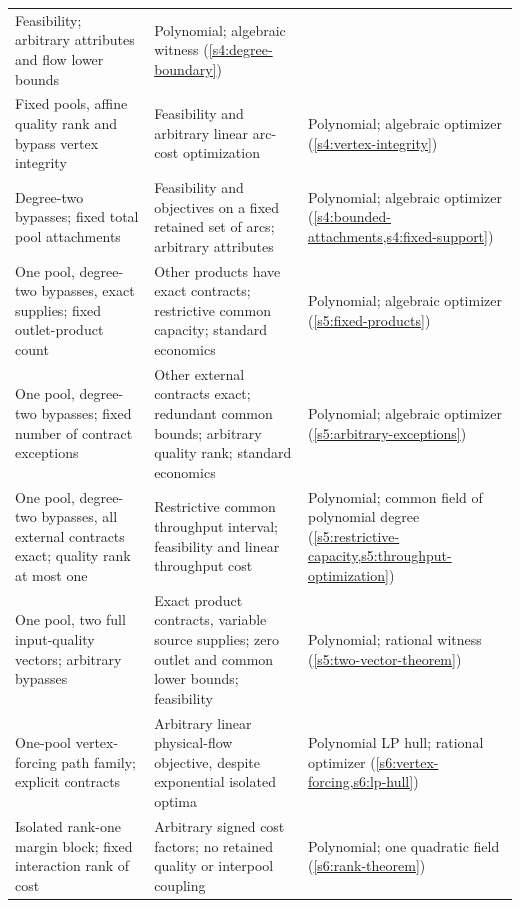 {\begin{longtable}{@{}>{\raggedright\arraybackslash}p{}>{\raggedright\arraybackslash}p{}>{\raggedright\arraybackslash}p{}@{}}
Feasibility; arbitrary attributes and flow lower bounds &
Polynomial; algebraic witness
(\cref{s4:degree-boundary})\\[3pt]
Fixed pools, affine quality rank and bypass vertex integrity &
Feasibility and arbitrary linear arc-cost optimization &
Polynomial; algebraic optimizer
(\cref{s4:vertex-integrity})\\[3pt]
Degree-two bypasses; fixed total pool attachments &
Feasibility and objectives on a fixed retained set of arcs; arbitrary attributes &
Polynomial; algebraic optimizer
(\cref{s4:bounded-attachments,s4:fixed-support})\\[3pt]
One pool, degree-two bypasses, exact supplies; fixed outlet-product count &
Other products have exact contracts; restrictive common capacity;
standard economics &
Polynomial; algebraic optimizer
(\cref{s5:fixed-products})\\[3pt]
One pool, degree-two bypasses; fixed number of contract exceptions &
Other external contracts exact; redundant common bounds; arbitrary
quality rank; standard economics &
Polynomial; algebraic optimizer
(\cref{s5:arbitrary-exceptions})\\[3pt]
One pool, degree-two bypasses, all external contracts exact; quality rank at most one &
Restrictive common throughput interval; feasibility and linear
throughput cost &
Polynomial; common field of polynomial degree
(\cref{s5:restrictive-capacity,s5:throughput-optimization})\\[3pt]
One pool, two full input-quality vectors; arbitrary bypasses &
Exact product contracts, variable source supplies; zero outlet and
common lower bounds; feasibility &
Polynomial; rational witness
(\cref{s5:two-vector-theorem})\\[3pt]
One-pool vertex-forcing path family; explicit contracts &
Arbitrary linear physical-flow objective, despite exponential isolated
optima &
Polynomial LP hull; rational optimizer
(\cref{s6:vertex-forcing,s6:lp-hull})\\[3pt]
Isolated rank-one margin block; fixed interaction rank of cost &
Arbitrary signed cost factors; no retained quality or interpool coupling &
Polynomial; one quadratic field
(\cref{s6:rank-theorem})\\
\bottomrule
\end{longtable}
}

